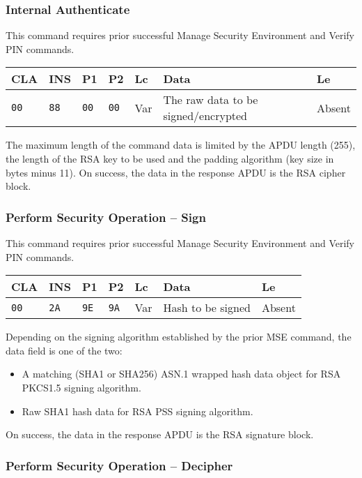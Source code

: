 \documentclass{article}
\begin{document}
\subsubsection{Internal Authenticate}

This command requires prior successful Manage Security Environment and
Verify PIN commands.
\begin{flushleft}
\begin{tabular}{|l|l|l|l|l|l|l|}
\hline
CLA & INS & P1 & P2 & Lc & Data & Le \\
\hline
\texttt{00} & \texttt{88} & \texttt{00} & \texttt{00} &
Var & The raw data to be signed\slash encrypted & Absent \\
\hline
\end{tabular}
\end{flushleft}
The maximum length of the command data is limited by the APDU length
(255), the length of the RSA key to be used and the padding algorithm
(key size in bytes minus 11). On success, the data in the response
APDU is the RSA cipher block.

\subsubsection{Perform Security Operation -- Sign}

This command requires prior successful Manage Security Environment and
Verify PIN commands.
\begin{flushleft}
\begin{tabular}{|l|l|l|l|l|l|l|}
\hline
CLA & INS & P1 & P2 & Lc & Data & Le \\
\hline
\texttt{00} & \texttt{2A} & \texttt{9E} & \texttt{9A} &
Var & Hash to be signed & Absent \\
\hline
\end{tabular}
\end{flushleft}
Depending on the signing algorithm established by the prior MSE
command, the data field is one of the two:
\begin{itemize}
  \item A matching (SHA1 or SHA256) ASN.1 wrapped hash data object for
    RSA PKCS1.5 signing algorithm.
  \item Raw SHA1 hash data for RSA PSS signing algorithm.
\end{itemize}
On success, the data in the response APDU is the RSA signature block.

\subsubsection{Perform Security Operation -- Decipher}
\end{document}
